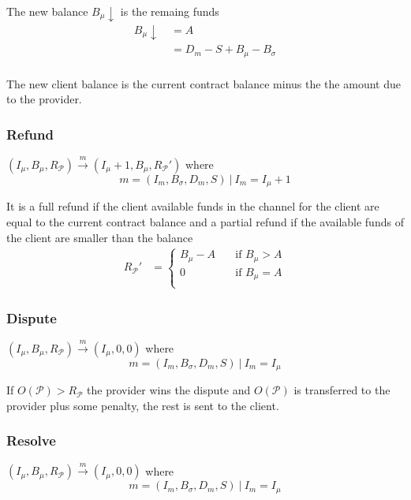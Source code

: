 \documentclass{llncs}
\begin{document}
The new balance $B_\mu\downarrow$ is the remaing funds
\begin{equation*}
\begin{split}
    B_\mu\downarrow \ &= A \\
    &= D_m - S + B_\mu - B_\sigma \\
\end{split}
\end{equation*}

The new client balance is the current contract balance minus the the amount due to the provider.

\subsubsection{Refund} $(I_\mu, B_\mu,R_\mathcal{P}) \xrightarrow{m} (I_\mu+1, B_\mu, R_\mathcal{P}')$ where
$$m = (I_m, B_\sigma, D_m, S)\ |\ I_m = I_\mu+1$$

It is a full refund if the client available funds in the channel for the client are equal to the current contract balance and a partial refund if the available funds of the client are smaller than the balance
\begin{equation*}
\begin{split}
    R_\mathcal{P}' &=
  \begin{cases}
      B_\mu - A & \quad \text{if } B_\mu > A \\
      0 & \quad \text{if } B_\mu = A \\
  \end{cases}
\end{split}
\end{equation*}

\subsubsection{Dispute} $(I_\mu, B_\mu,R_\mathcal{P}) \xrightarrow{m} (I_\mu, 0, 0)$ where
$$m = (I_m, B_\sigma, D_m, S)\ |\ I_m = I_\mu$$

If $O(\mathcal{P}) > R_\mathcal{P}$ the provider wins the dispute and $O(\mathcal{P})$ is transferred to the provider plus some penalty, the rest is sent to the client.

\subsubsection{Resolve} $(I_\mu, B_\mu,R_\mathcal{P}) \xrightarrow{m} (I_\mu, 0, 0)$ where
$$m = (I_m, B_\sigma, D_m, S)\ |\ I_m = I_\mu$$
\end{document}

